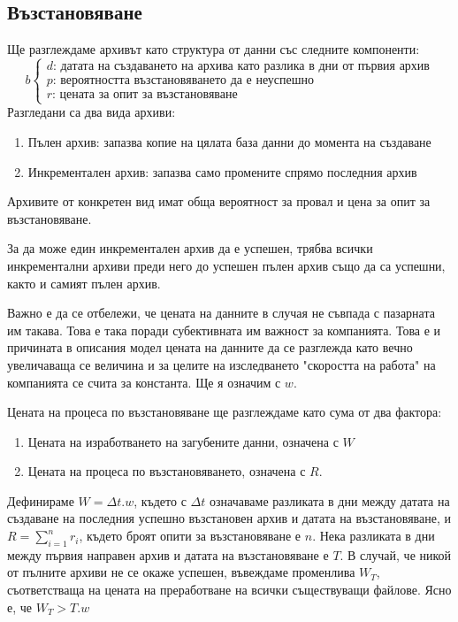 \documentclass[11pt, a4paper]{article}
\theoremstyle{definition}
\begin{document}
	\subsection{Възстановяване}
		Ще разглеждаме архивът като структура от данни със следните компоненти:
		$$
		b
		\begin{cases}
		d \text{: датата на създаването на архива като разлика в дни от първия архив}\\
		p \text{: вероятността възстановяването да е неуспешно}\\
		r \text{: цената за опит за възстановяване}
		\end{cases}
		$$
		Разгледани са два вида архиви:
		\begin{enumerate}
			\item Пълен архив: запазва копие на цялата база данни до момента на създаване
			\item Инкрементален архив: запазва само промените спрямо последния архив
		\end{enumerate}
		Архивите от конкретен вид имат обща вероятност за провал и цена за опит за възстановяване. \par
		За да може един инкрементален архив да е успешен, трябва всички инкрементални архиви преди него до успешен пълен архив също да са успешни, както и самият пълен архив.\par
		Важно е да се отбележи, че цената на данните в случая не съвпада с пазарната им такава. Това е така поради субективната им важност за компанията. Това е и причината в описания модел цената на данните да се разглежда като вечно увеличаваща се величина и за целите на изследването "скоростта на работа" на компанията се счита за константа. Ще я означим с $w$.\par
		Цената на процеса по възстановяване ще разглеждаме като сума от два фактора:
		\begin{enumerate}
			\item Цената на изработването на загубените данни, означена с $W$
			\item Цената на процеса по възстановяването, означена с $R$.
		\end{enumerate}
		Дефинираме $W = \Delta t.w$, където с $\Delta t$ означаваме разликата в дни между датата на създаване на последния успешно възстановен архив и датата на възстановяване, и $R = \sum_{i=1}^{n} r_i$, където броят опити за възстановяване е $n$.
		Нека разликата в дни между първия направен архив и датата на възстановяване е $T$. В случай, че никой от пълните архиви не се окаже успешен, въвеждаме променлива $W_T$, съответстваща на цената на преработване на всички съществуващи файлове. Ясно е, че $W_T>T.w$\par
		\newpage
\end{document}
